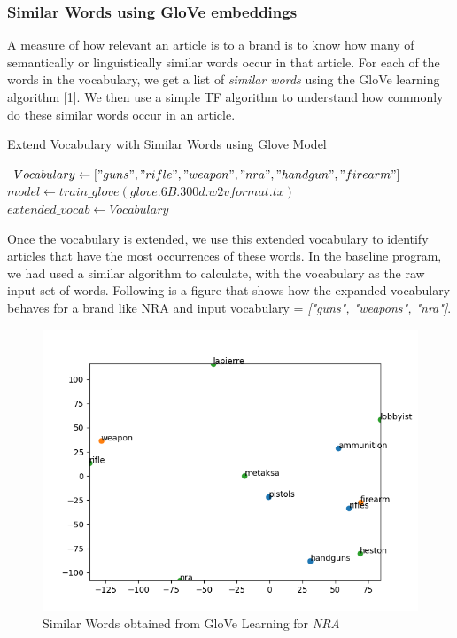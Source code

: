 \documentclass[paper=a4, fontsize=11pt]{scrartcl}
\numberwithin{equation}{section}		%
\numberwithin{figure}{section}			%
\numberwithin{table}{section}				%
\begin{document}
\subsubsection {Similar Words using GloVe embeddings}
A measure of how relevant an article is to a brand is to know how many of semantically or linguistically similar words occur in that article. For each of the words in the vocabulary, we get a list of \textit{similar words} using the GloVe learning algorithm [1]. We then use a simple TF algorithm to understand how commonly do these similar words occur in an article.
\begin{center}
\begin{algorithm}
  \caption{Extend Vocabulary with Similar Words using Glove Model}

 $Vocabulary \gets ["guns", "rifle", "weapon", "nra", "handgun", "firearm"] $\;
 $model \gets train\_glove(\textit{glove.6B.300d.w2vformat.tx}) $\;
  {
      $extended\_vocab \gets Vocabulary $\;
    \;
  }
\end{algorithm}
\end{center}
Once the vocabulary is extended, we use this extended vocabulary to identify articles that have the most occurrences of these words. In the baseline program, we had used a similar algorithm to calculate, with the vocabulary as the raw input set of words. Following is a figure that shows how the expanded vocabulary behaves for a brand like NRA and input vocabulary = \textit {["guns", "weapons", "nra"]}.

\begin{figure}[ht]
	\centering
 	 \includegraphics[width=0.5\linewidth]{similar_words_nra.png}
	  \caption{Similar Words obtained from GloVe Learning for \textit{NRA}}
 	 \label{fig:Similar Words for NRA}
\end{figure}
\end{document}
